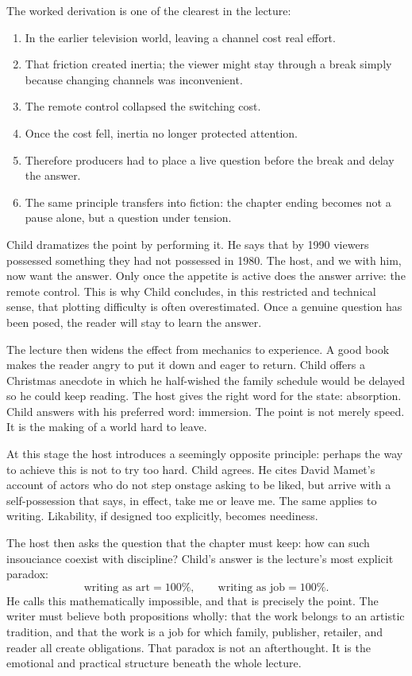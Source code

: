 The worked derivation is one of the clearest in the lecture:
\begin{enumerate}
\item In the earlier television world, leaving a channel cost real effort.
\item That friction created inertia; the viewer might stay through a break simply because changing channels was inconvenient.
\item The remote control collapsed the switching cost.
\item Once the cost fell, inertia no longer protected attention.
\item Therefore producers had to place a live question before the break and delay the answer.
\item The same principle transfers into fiction: the chapter ending becomes not a pause alone, but a question under tension.
\end{enumerate}

Child dramatizes the point by performing it. He says that by 1990 viewers possessed something they had not possessed in 1980. The host, and we with him, now want the answer. Only once the appetite is active does the answer arrive: the remote control. This is why Child concludes, in this restricted and technical sense, that plotting difficulty is often overestimated. Once a genuine question has been posed, the reader will stay to learn the answer.

The lecture then widens the effect from mechanics to experience. A good book makes the reader angry to put it down and eager to return. Child offers a Christmas anecdote in which he half-wished the family schedule would be delayed so he could keep reading. The host gives the right word for the state: absorption. Child answers with his preferred word: immersion. The point is not merely speed. It is the making of a world hard to leave.

At this stage the host introduces a seemingly opposite principle: perhaps the way to achieve this is not to try too hard. Child agrees. He cites David Mamet's account of actors who do not step onstage asking to be liked, but arrive with a self-possession that says, in effect, take me or leave me. The same applies to writing. Likability, if designed too explicitly, becomes neediness.

The host then asks the question that the chapter must keep: how can such insouciance coexist with discipline? Child's answer is the lecture's most explicit paradox:
\begin{equation}
\text{writing as art} = 100\%, \qquad
\text{writing as job} = 100\%.
\end{equation}
He calls this mathematically impossible, and that is precisely the point. The writer must believe both propositions wholly: that the work belongs to an artistic tradition, and that the work is a job for which family, publisher, retailer, and reader all create obligations. That paradox is not an afterthought. It is the emotional and practical structure beneath the whole lecture.

